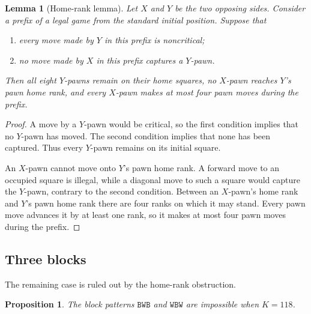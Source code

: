 \documentclass[11pt]{article}
\newtheorem{lemma}[theorem]{Lemma}
\newtheorem{proposition}[theorem]{Proposition}
\theoremstyle{definition}
\newcommand{\B}{\mathtt{B}}
\newcommand{\W}{\mathtt{W}}
\begin{document}
\begin{lemma}[Home-rank lemma]\label{lem:homerank}
Let $X$ and $Y$ be the two opposing sides. Consider a prefix of a legal game
from the standard initial position. Suppose that
\begin{enumerate}
  \item every move made by $Y$ in this prefix is noncritical;
  \item no move made by $X$ in this prefix captures a $Y$-pawn.
\end{enumerate}
Then all eight $Y$-pawns remain on their home squares, no $X$-pawn reaches
$Y$'s pawn home rank, and every $X$-pawn makes at most four pawn moves during
the prefix.
\end{lemma}

\begin{proof}
A move by a $Y$-pawn would be critical, so the first condition implies that
no $Y$-pawn has moved. The second condition implies that none has been
captured. Thus every $Y$-pawn remains on its initial square.

An $X$-pawn cannot move onto $Y$'s pawn home rank. A forward move to an
occupied square is illegal, while a diagonal move to such a square would
capture the $Y$-pawn, contrary to the second condition. Between an $X$-pawn's
home rank and $Y$'s pawn home rank there are four ranks on which it may stand.
Every pawn move advances it by at least one rank, so it makes at most four
pawn moves during the prefix.
\end{proof}

\subsection{Three blocks}

The remaining case is ruled out by the home-rank obstruction.

\begin{proposition}\label{prop:threeblocks}
The block patterns $\B\W\B$ and $\W\B\W$ are impossible when $K=118$.
\end{proposition}
\end{document}
